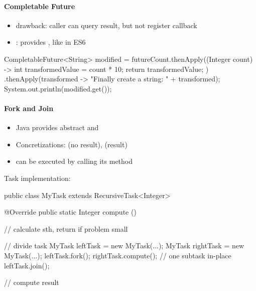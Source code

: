 \paragraph{Completable Future}
\begin{itemize}
  \item {} drawback: caller can query result, but not register callback
  \item {}: provides , like  in ES6
\end{itemize}
\begin{java}
  CompletableFuture<String> modified =
    futureCount.thenApply((Integer count) -> {
      int transformedValue = count * 10;
      return transformedValue;
    })
    .thenApply(transformed -> "Finally create a string: "
      + transformed);
  System.out.println(modified.get());
\end{java}

\paragraph{Fork and Join}
\begin{itemize}
  \item Java provides abstract  and 
  \item Concretizations:  (no result),  (result)
  \item can be executed by  calling its  method
\end{itemize}
Task implementation:
\begin{java}
  public class MyTask extends RecursiveTask<Integer> {
    @Override
    public static Integer compute () {
      // calculate sth, return if problem small
      
      // divide task
      MyTask leftTask = new MyTask(...);
      MyTask rightTask = new MyTask(...);
      leftTask.fork();
      rightTask.compute(); // one subtask in-place
      leftTask.join();
  
      // compute result
    }
  }
\end{java}

